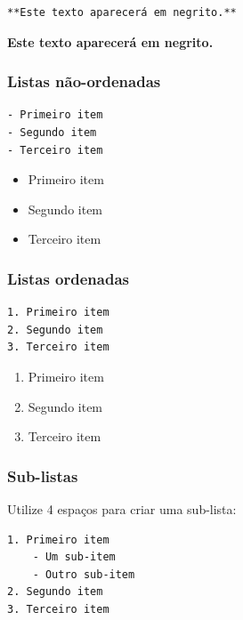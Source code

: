 \documentclass[
  10pt,
  a4paper]{book}
\providecommand{\tightlist}{%
  \setlength{\itemsep}{0pt}\setlength{\parskip}{0pt}}
\begin{document}
\begin{verbatim}
**Este texto aparecerá em negrito.**
\end{verbatim}

\textbf{Este texto aparecerá em negrito.}

\hypertarget{listas-nuxe3o-ordenadas}{%
\subsubsection*{Listas não-ordenadas}\label{listas-nuxe3o-ordenadas}}


\begin{verbatim}
- Primeiro item
- Segundo item
- Terceiro item
\end{verbatim}

\begin{itemize}
\tightlist
\item
  Primeiro item
\item
  Segundo item
\item
  Terceiro item
\end{itemize}

\hypertarget{listas-ordenadas}{%
\subsubsection*{Listas ordenadas}\label{listas-ordenadas}}


\begin{verbatim}
1. Primeiro item
2. Segundo item
3. Terceiro item
\end{verbatim}

\begin{enumerate}
\def\labelenumi{\arabic{enumi}.}
\tightlist
\item
  Primeiro item
\item
  Segundo item
\item
  Terceiro item
\end{enumerate}

\hypertarget{sub-listas}{%
\subsubsection*{Sub-listas}\label{sub-listas}}


Utilize 4 espaços para criar uma sub-lista:

\begin{verbatim}
1. Primeiro item
    - Um sub-item
    - Outro sub-item
2. Segundo item
3. Terceiro item
\end{verbatim}
\end{document}
